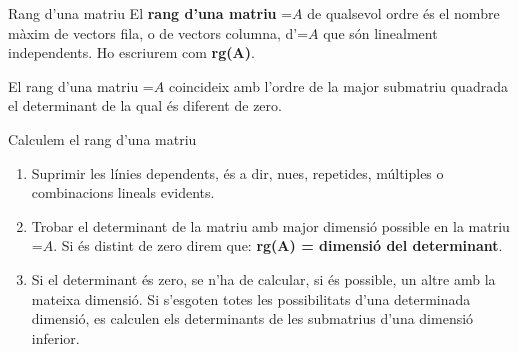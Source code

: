 \documentclass[11pt,a4paper]{article}
\newcommand{\fmm}[1]{\setbox0=\hbox{$#1$}\ifdim\wd0>\linewidth\fmdisp{#1}\else\mbox{\box0}\fi}
\newcommand{\fmdisp}[1]{\[\setbox2=\hbox{$\displaystyle #1$}\ifdim\wd2>\linewidth\resizebox{\linewidth}{!}{\box2}\else\box2\fi\]}
\begin{document}
\begin{fmdef}{Rang d'una matriu}
El \textbf{rang d'una matriu} \fmm{A} de qualsevol ordre és el nombre màxim de vectors fila, o de vectors columna, d'\fmm{A} que són linealment independents. Ho escriurem com \textbf{rg(A)}.

\begin{fmnote}El rang d'una matriu \fmm{A} coincideix amb l'ordre de la major submatriu quadrada el determinant de la qual és diferent de zero.\end{fmnote}
\end{fmdef}

\begin{fmprop}{Calculem el rang d'una matriu}
\begin{enumerate}
\item Suprimir les línies dependents, és a dir, nu\lgem{}es, repetides, múltiples o combinacions lineals evidents.
\item Trobar el determinant de la matriu amb major dimensió possible en la matriu \fmm{A}. Si és distint de zero direm que: \textbf{rg(A) = dimensió del determinant}.
\item Si el determinant és zero, se n'ha de calcular, si és possible, un altre amb la mateixa dimensió. Si s'esgoten totes les possibilitats d'una determinada dimensió, es calculen els determinants de les submatrius d'una dimensió inferior.
\end{enumerate}
\end{fmprop}
\end{document}
